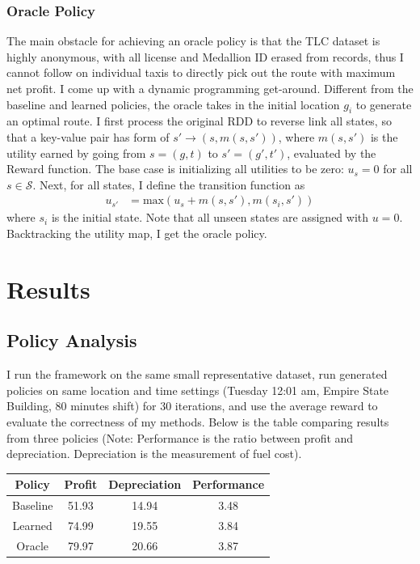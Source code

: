 \documentclass[letterpaper, 10 pt, conference]{ieeeconf}
\begin{document}
\subsubsection{Oracle Policy}
The main obstacle for achieving an oracle policy is that the TLC dataset is highly anonymous, with all license and Medallion ID erased from records, thus I cannot follow on individual taxis to directly pick out the route with maximum net profit. I come up with a dynamic programming get-around. Different from the baseline and learned policies, the oracle takes in the initial location $g_i$ to generate an optimal route. I first process the original RDD to reverse link all states, so that a key-value pair has form of $s'\to(s,m(s,s'))$, where $m(s,s')$ is the utility earned by going from $s=(g,t)$ to $s'=(g',t')$, evaluated by the Reward function. The base case is initializing all utilities to be zero: $u_s=0$ for all $s\in\mathcal{S}$. Next, for all states, I define the transition function as
\begin{align}
u_{s'} &= \text{max}(u_{s}+m(s, s'), m(s_i, s'))
\end{align}
where $s_i$ is the initial state. Note that all unseen states are assigned with $u=0$. Backtracking the utility map, I get the oracle policy.
\section{Results}
\subsection{Policy Analysis}
I run the framework on the same small representative dataset, run generated policies on same location and time settings (Tuesday 12:01 am, Empire State Building, 80 minutes shift) for 30 iterations, and use the average reward to evaluate the correctness of my methods. Below is the table comparing results from three policies (Note: Performance is the ratio between profit and depreciation. Depreciation is the measurement of fuel cost).
\begin{center}
\begin{tabular}{|c||c|c|c|}
\hline
Policy & Profit & Depreciation & Performance \\ \hline
Baseline & 51.93 & 14.94 & 3.48 \\    \hline
Learned & 74.99 & 19.55 & 3.84 \\    \hline
Oracle & 79.97 & 20.66 & 3.87 \\    \hline
\end{tabular}
\end{center}
\end{document}
